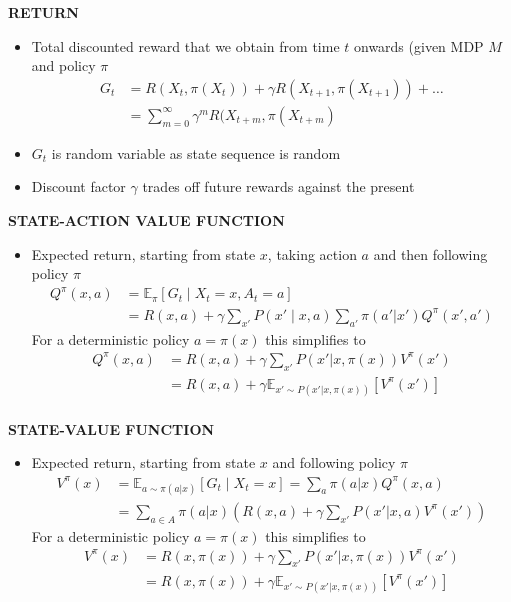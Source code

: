\begin{whitebox}{\textbf{RETURN}}
    \begin{itemize}
        \item Total discounted reward that we obtain from time $t$ onwards (given MDP $M$ and policy $\pi$
        \begin{align*}
            G_t&=R(X_t,\pi(X_t))+\gamma R(X_{t+1},\pi(X_{t+1}))+\dots\\
            &=\sum_{m=0}^\infty\gamma^mR(X_{t+m},\pi(X_{t+m})
        \end{align*}
        \item $G_t$ is random variable as state sequence is random
        \item Discount factor $\gamma$ trades off future rewards against the present
    \end{itemize}
\end{whitebox}

\begin{whitebox}{\textbf{STATE-ACTION VALUE FUNCTION}}
    \begin{itemize}
        \item Expected return, starting from state $x$, taking action $a$ and then following policy $\pi$
        \begin{align*}
            Q^\pi(x,a)&=\mathbb{E}_\pi[G_t\mid X_t=x,A_t=a]\\
            &=R(x,a)+\gamma\sum_{x'}P(x'\mid x,a)\sum_{a'}\pi(a'|x')Q^\pi(x',a')
        \end{align*}
        For a deterministic policy $a=\pi(x)$ this simplifies to
        \begin{align*}
            Q^\pi(x,a)&=R(x,a)+\gamma\sum_{x'}P(x'|x,\pi(x))V^\pi(x')\\
            &=R(x,a)+\gamma\mathbb{E}_{x'\sim P(x'|x,\pi(x))}[V^\pi(x')]\\
        \end{align*}
    \end{itemize}
\end{whitebox}

\begin{whitebox}{\textbf{STATE-VALUE FUNCTION}}
    \begin{itemize}
        \item Expected return, starting from state $x$ and following policy $\pi$
        \begin{align*}
            V^\pi(x)&=\mathbb{E}_{a\sim\pi(a|x)}[G_t\mid X_t=x]=\sum_a\pi(a|x)Q^\pi(x,a)\\
            &=\sum_{a\in A}\pi(a|x)\left(R(x,a)+\gamma\sum_{x'}P(x'|x,a)V^\pi(x')\right)
        \end{align*}
        For a deterministic policy $a=\pi(x)$ this simplifies to
        \begin{align*}
            V^\pi(x)&=R(x,\pi(x))+\gamma\sum_{x'}P(x'|x,\pi(x))V^\pi(x')\\
            &=R(x,\pi(x))+\gamma\mathbb{E}_{x'\sim P(x'|x,\pi(x))}[V^\pi(x')]
        \end{align*}
    \end{itemize}
\end{whitebox}

